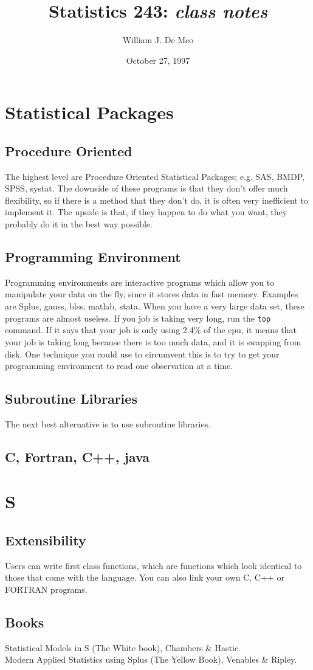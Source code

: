 \documentclass{article}
\begin{document}
\title{Statistics 243: \emph{class notes}}
\author{William J. De Meo}
\date{October 27, 1997 }
\maketitle
\section{Statistical Packages}
\subsection{Procedure Oriented}
The highest level are Procedure Oriented Statistical Packages; e.g.
SAS, BMDP, SPSS, systat.  The downside of these programs is that they
don't offer much flexibility, so if there is a method that they don't do,
it is often very inefficient to implement it.  The upside is that, if 
they happen to do what you want, they probably do it in the best way possible.
\subsection{Programming Environment}
Programming environments are interactive programs which allow you to 
manipulate your data on the fly, since it stores data in fast memory.
Examples are Splus, gauss, blss, matlab, stata.  When you have a very
large data set, these programs are almost useless.  If you job is
taking very long, run the {\tt top} command.  If it says that your job
is only using 2.4\% of the cpu, it means that your job is taking long
because there is too much data, and it is swapping from disk.  One technique
you could use to circumvent this is to try to get your programming
environment to read one observation at a time.
\subsection{Subroutine Libraries}
The next best alternative is to use subroutine libraries.
\subsection{C, Fortran, C++, java}

\section{S}
\subsection{Extensibility}  Users can write first class functions, 
which are functions which look identical to those that come with the language. 
You can also link your own C, C++ or FORTRAN programs.

\subsection{Books}
Statistical Models in S (The White book), Chambers \& Hastie.\\
Modern Applied Statistics using Splus (The Yellow Book), Venables \& Ripley.\\
\end{document}
